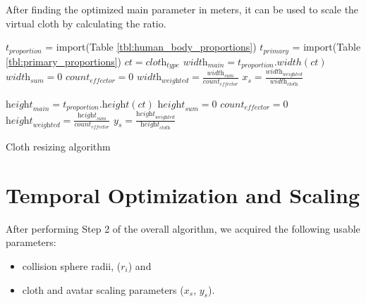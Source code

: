 After finding the optimized main parameter in meters, it can be used to scale the virtual cloth by calculating the ratio.

\begin{algorithm}[ht]
\DontPrintSemicolon %

$t_\textit{proportion}$ = {\textrm import}({\textrm Table \ref{tbl:human_body_proportions}}) \;
$t_\textit{primary}$ = {\textrm import}({\textrm Table \ref{tbl:primary_proportions}}) \;
$ct=\textit{cloth}_\textit{type}$\;
$\textit{width}_\textit{main}=t_\textit{proportion}.width(ct)$\;
$\textit{width}_\textit{sum}=0$\;
$\textit{count}_\textit{effector}=0$\;
$\textit{width}_\textit{weighted}=\frac{\textit{width}_\textit{sum}}{\textit{count}_{\textit{effector}}}$\;
$x_s=\frac{\textit{width}_\textit{weighted}}{\textit{width}_\textit{cloth}}$\;

$\textit{height}_\textit{main}=t_\textit{proportion}.\textit{height}(ct)$\;
$\textit{height}_\textit{sum}=0$\;
$\textit{count}_\textit{effector}=0$\;
$\textit{height}_\textit{weighted}=\frac{\textit{height}_\textit{sum}}{\textit{count}_{\textit{effector}}}$\;
$y_s=\frac{\textit{height}_\textit{weighted}}{\textit{height}_\textit{cloth}}$\;
\caption{Cloth resizing algorithm}
\label{algo:cloth_resize}
\end{algorithm}

\section{Temporal Optimization and Scaling}
After performing Step 2 of the overall algorithm, we acquired the following usable parameters:

\begin{itemize}
\item collision sphere radii, ($r_i$) and
\item cloth and avatar scaling parameters ($x_s$, $y_s$).
\end{itemize}

